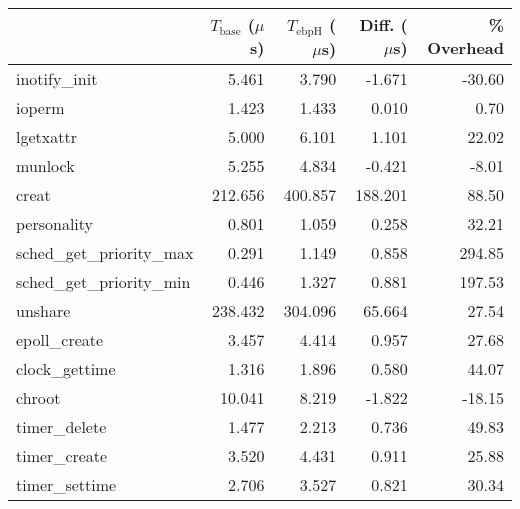 \begin{tabular}{>{\ttfamily}lrrrr}
\toprule
\multicolumn{1}{l}{System Call} & $T_\text{base}$ ($\mu$s) & $T_\text{ebpH}$ ($\mu$s) & Diff. ($\mu$s) & \% Overhead \\
\midrule
                  inotify\_init &                    5.461 &                    3.790 &         -1.671 &      -30.60 \\
                         ioperm &                    1.423 &                    1.433 &          0.010 &        0.70 \\
                      lgetxattr &                    5.000 &                    6.101 &          1.101 &       22.02 \\
                        munlock &                    5.255 &                    4.834 &         -0.421 &       -8.01 \\
                          creat &                  212.656 &                  400.857 &        188.201 &       88.50 \\
                    personality &                    0.801 &                    1.059 &          0.258 &       32.21 \\
      sched\_get\_priority\_max &                    0.291 &                    1.149 &          0.858 &      294.85 \\
      sched\_get\_priority\_min &                    0.446 &                    1.327 &          0.881 &      197.53 \\
                        unshare &                  238.432 &                  304.096 &         65.664 &       27.54 \\
                  epoll\_create &                    3.457 &                    4.414 &          0.957 &       27.68 \\
                 clock\_gettime &                    1.316 &                    1.896 &          0.580 &       44.07 \\
                         chroot &                   10.041 &                    8.219 &         -1.822 &      -18.15 \\
                  timer\_delete &                    1.477 &                    2.213 &          0.736 &       49.83 \\
                  timer\_create &                    3.520 &                    4.431 &          0.911 &       25.88 \\
                 timer\_settime &                    2.706 &                    3.527 &          0.821 &       30.34 \\

\end{tabular}
